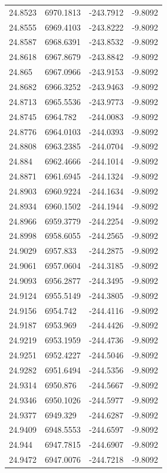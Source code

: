 \begin{table}[H]
\begin{tabular}{llll}
24.8523 & 6970.1813 & -243.7912 & -9.8092 \\
24.8555 & 6969.4103 & -243.8222 & -9.8092 \\
24.8587 & 6968.6391 & -243.8532 & -9.8092 \\
24.8618 & 6967.8679 & -243.8842 & -9.8092 \\
24.865 & 6967.0966 & -243.9153 & -9.8092 \\
24.8682 & 6966.3252 & -243.9463 & -9.8092 \\
24.8713 & 6965.5536 & -243.9773 & -9.8092 \\
24.8745 & 6964.782 & -244.0083 & -9.8092 \\
24.8776 & 6964.0103 & -244.0393 & -9.8092 \\
24.8808 & 6963.2385 & -244.0704 & -9.8092 \\
24.884 & 6962.4666 & -244.1014 & -9.8092 \\
24.8871 & 6961.6945 & -244.1324 & -9.8092 \\
24.8903 & 6960.9224 & -244.1634 & -9.8092 \\
24.8934 & 6960.1502 & -244.1944 & -9.8092 \\
24.8966 & 6959.3779 & -244.2254 & -9.8092 \\
24.8998 & 6958.6055 & -244.2565 & -9.8092 \\
24.9029 & 6957.833 & -244.2875 & -9.8092 \\
24.9061 & 6957.0604 & -244.3185 & -9.8092 \\
24.9093 & 6956.2877 & -244.3495 & -9.8092 \\
24.9124 & 6955.5149 & -244.3805 & -9.8092 \\
24.9156 & 6954.742 & -244.4116 & -9.8092 \\
24.9187 & 6953.969 & -244.4426 & -9.8092 \\
24.9219 & 6953.1959 & -244.4736 & -9.8092 \\
24.9251 & 6952.4227 & -244.5046 & -9.8092 \\
24.9282 & 6951.6494 & -244.5356 & -9.8092 \\
24.9314 & 6950.876 & -244.5667 & -9.8092 \\
24.9346 & 6950.1026 & -244.5977 & -9.8092 \\
24.9377 & 6949.329 & -244.6287 & -9.8092 \\
24.9409 & 6948.5553 & -244.6597 & -9.8092 \\
24.944 & 6947.7815 & -244.6907 & -9.8092 \\
24.9472 & 6947.0076 & -244.7218 & -9.8092 \\

\end{tabular}
\end{table}
